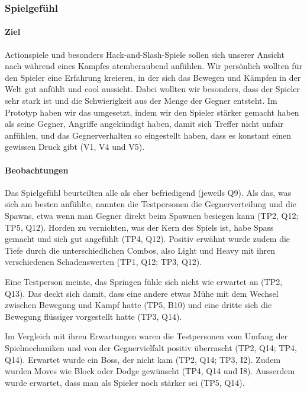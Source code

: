 \documentclass[../Main.tex]{subfiles}
\begin{document}
\subsubsection{Spielgefühl}

\paragraph{Ziel}
Actionspiele und besonders Hack-and-Slash-Spiele sollen sich unserer Ansicht nach während eines Kampfes atemberaubend anfühlen. Wir persönlich wollten für den Spieler eine Erfahrung kreieren, in der sich das Bewegen und Kämpfen in der Welt gut anfühlt und cool aussieht. Dabei wollten wir besonders, dass der Spieler sehr stark ist und die Schwierigkeit aus der Menge der Gegner entsteht. Im Prototyp haben wir das umgesetzt, indem wir den Spieler stärker gemacht haben als seine Gegner, Angriffe angekündigt haben, damit sich Treffer nicht unfair anfühlen, und das Gegnerverhalten so eingestellt haben, dass es konstant einen gewissen Druck gibt (V1, V4 und V5).

\paragraph{Beobachtungen}
Das Spielgefühl beurteilten alle als eher befriedigend (jeweils Q9). Als das, was sich am besten anfühlte, nannten die Testpersonen die Gegnerverteilung und die Spawns, etwa wenn man Gegner direkt beim Spawnen besiegen kann (TP2, Q12; TP5, Q12). Horden zu vernichten, was der Kern des Spiels ist, habe Spass gemacht und sich gut angefühlt (TP4, Q12). Positiv erwähnt wurde zudem die Tiefe durch die unterschiedlichen Combos, also Light und Heavy mit ihren verschiedenen Schadenswerten (TP1, Q12; TP3, Q12).

Eine Testperson meinte, das Springen fühle sich nicht wie erwartet an (TP2, Q13). Das deckt sich damit, dass eine andere etwas Mühe mit dem Wechsel zwischen Bewegung und Kampf hatte (TP5, B10) und eine dritte sich die Bewegung flüssiger vorgestellt hatte (TP3, Q14).

Im Vergleich mit ihren Erwartungen waren die Testpersonen vom Umfang der Spielmechaniken und von der Gegnervielfalt positiv überrascht (TP2, Q14; TP4, Q14). Erwartet wurde ein Boss, der nicht kam (TP2, Q14; TP3, I2). Zudem wurden Moves wie Block oder Dodge gewünscht (TP4, Q14 und I8). Ausserdem wurde erwartet, dass man als Spieler noch stärker sei (TP5, Q14).
\end{document}
